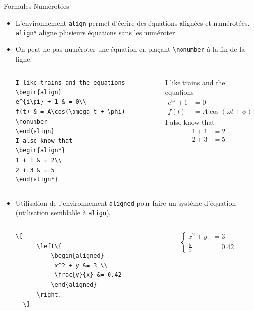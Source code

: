 \begin{frame}{Formules Numérotées}
\begin{itemize}
    \item L'environnement \lstinline|align| permet d'écrire des équations alignées et numérotées. \lstinline|align*| aligne plusieurs équations sans les numéroter.
    \item On peut ne pas numéroter une équation en plaçant \lstinline|\nonumber| à la fin de la ligne.
      \begin{columns}
        \begin{column}{0.5\textwidth}
          \begin{lstlisting}[style = nonumbers]
I like trains and the equations
\begin{align}
e^{i\pi} + 1 & = 0\\
f(t) & = A\cos(\omega t + \phi) \nonumber
\end{align}
I also know that
\begin{align*}
1 + 1 & = 2\\
2 + 3 & = 5
\end{align*}
          \end{lstlisting}
        \end{column}
        \begin{column}{0.5\textwidth}
          I like trains and the equations
          \begin{align}
e^{i\pi} + 1 & = 0\\
f(t) & = A\cos(\omega t + \phi) \nonumber
          \end{align}
          I also know that
          \begin{align*}
1 + 1 & = 2\\
2 + 3 & = 5
          \end{align*}
        \end{column}
      \end{columns}
\framebreak
    \item Utilisation de l'environnement \lstinline|aligned| pour faire un système d'équation (utilisation semblable à \lstinline|align|).
    \begin{columns}
      \begin{column}{0.5\textwidth}
        \begin{lstlisting}[style=nonumbers]
  \[
      \left\{
          \begin{aligned}
           x^2 + y &= 3 \\
           \frac{y}{x} &= 0.42
          \end{aligned}
      \right.
  \]
        \end{lstlisting}
      \end{column}
      \begin{column}{0.5\textwidth}
            \[ \left\{\begin{aligned}
                x^2 + y &= 3 \\
                \frac{y}{x} &= 0.42
            \end{aligned}\right. \]
      \end{column}
    \end{columns}
  \end{itemize}
\end{frame}

